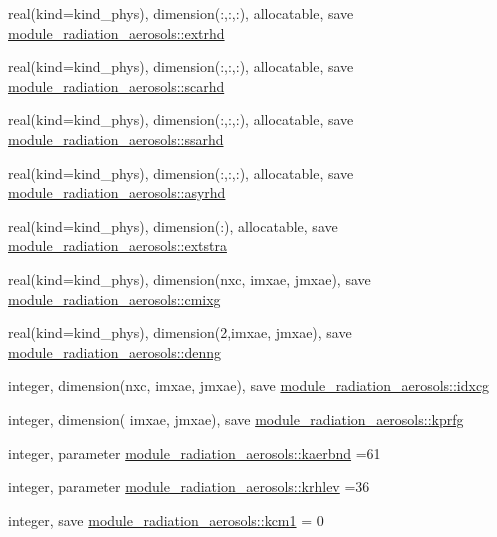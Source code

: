 \begin{DoxyCompactItemize}
\item 
real(kind=kind\+\_\+phys), dimension(\+:,\+:,\+:), allocatable, save \hyperlink{group__module__radiation__aerosols_ga1c69f7b8ff0c98252e94def83dabfed4}{module\+\_\+radiation\+\_\+aerosols\+::extrhd}
\item 
real(kind=kind\+\_\+phys), dimension(\+:,\+:,\+:), allocatable, save \hyperlink{group__module__radiation__aerosols_ga859ba893a7b0b727ce02f3f29906a0a6}{module\+\_\+radiation\+\_\+aerosols\+::scarhd}
\item 
real(kind=kind\+\_\+phys), dimension(\+:,\+:,\+:), allocatable, save \hyperlink{group__module__radiation__aerosols_gac0714d386ee3dc2ca7f6692905566274}{module\+\_\+radiation\+\_\+aerosols\+::ssarhd}
\item 
real(kind=kind\+\_\+phys), dimension(\+:,\+:,\+:), allocatable, save \hyperlink{group__module__radiation__aerosols_ga090d37e62ba333db64e28bf89e89a08d}{module\+\_\+radiation\+\_\+aerosols\+::asyrhd}
\item 
real(kind=kind\+\_\+phys), dimension(\+:), allocatable, save \hyperlink{group__module__radiation__aerosols_gac0c59f22f472671cd86221cc1ed46c60}{module\+\_\+radiation\+\_\+aerosols\+::extstra}
\item 
real(kind=kind\+\_\+phys), dimension(nxc, imxae, jmxae), save \hyperlink{group__module__radiation__aerosols_ga358c83599fb321a59c958e54d9f284d9}{module\+\_\+radiation\+\_\+aerosols\+::cmixg}
\item 
real(kind=kind\+\_\+phys), dimension(2,imxae, jmxae), save \hyperlink{group__module__radiation__aerosols_ga0ccc698bc870cb6ccbc1c2b64a3f45f6}{module\+\_\+radiation\+\_\+aerosols\+::denng}
\item 
integer, dimension(nxc, imxae, jmxae), save \hyperlink{group__module__radiation__aerosols_ga4cb38abaf6ece5a0ed717edd6f6b4078}{module\+\_\+radiation\+\_\+aerosols\+::idxcg}
\item 
integer, dimension(     imxae, jmxae), save \hyperlink{group__module__radiation__aerosols_ga28df10ba381278cc7474bea0bfdaa870}{module\+\_\+radiation\+\_\+aerosols\+::kprfg}
\item 
integer, parameter \hyperlink{group__module__radiation__aerosols_gad345c77fc29d8b02de34990162645a66}{module\+\_\+radiation\+\_\+aerosols\+::kaerbnd} =61
\item 
integer, parameter \hyperlink{group__module__radiation__aerosols_ga33f2d4489a1730a27cbdc2e2add0f977}{module\+\_\+radiation\+\_\+aerosols\+::krhlev} =36
\item 
integer, save \hyperlink{group__module__radiation__aerosols_ga92b09dd26cc321af3b5da0b1c310a588}{module\+\_\+radiation\+\_\+aerosols\+::kcm1} = 0

\end{DoxyCompactItemize}
